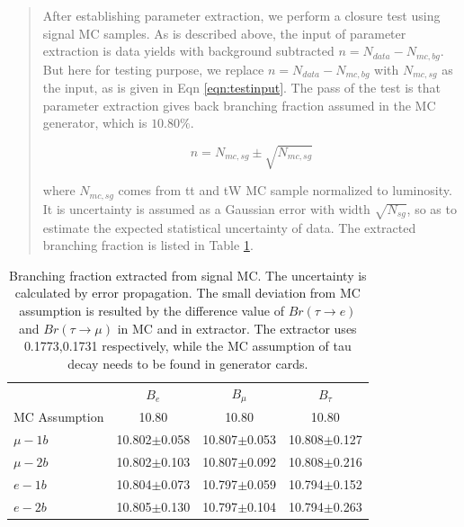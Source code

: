 \begin{quote}
    
    After establishing parameter extraction, we perform a closure test using 
    signal MC samples. As is described above, the input of parameter extraction 
    is data yields with background subtracted $n=N_{data} - N_{mc,bg}$. 
    But here for testing purpose, we replace $n=N_{data} - N_{mc,bg}$ with $N_{mc,sg}$ as the input,
    as is given in Eqn \ref{eqn:testinput}.
    The pass of the test is that parameter extraction 
    gives back branching fraction assumed in the MC generator, which is $10.80\%$.
    
    
    \begin{equation}
    	n=N_{mc,sg}\pm \sqrt{N_{mc,sg}}
    	\label{eqn:testinput}
    \end{equation}
    
    where $N_{mc,sg}$ comes from tt and tW MC sample normalized to luminosity. 
    It is uncertainty is assumed as a Gaussian error with width $\sqrt{N_{sg}}$, 
    so as to estimate the expected statistical uncertainty of data.
    The extracted branching fraction is listed in Table \ref{test_ana}.

\end{quote}



\begin{table}[ht]
    \centering
	\begin{tabular}{l|ccc}
    \hline
          	 & $B_e$             &   $B_\mu$       	 & 	  $B_\tau$   	 \\
    MC Assumption  & 10.80 		 &  10.80 		 	 & 	  10.80     	 \\
    \hline
  	$\mu-1b$ &   10.802$\pm$0.058  &   10.807$\pm$0.053  &    10.808$\pm$0.127 \\
  	$\mu-2b$ &   10.802$\pm$0.103  &   10.807$\pm$0.092  &    10.808$\pm$0.216 \\
  	$e-1b$   &   10.804$\pm$0.073  &   10.797$\pm$0.059  &    10.794$\pm$0.152 \\
  	$e-2b$   &   10.805$\pm$0.130  &   10.797$\pm$0.104  &    10.794$\pm$0.263 \\
    \hline
	\end{tabular}
	
    \caption{Branching fraction extracted from signal MC. The 
    uncertainty is calculated by error propagation. The small 
    deviation from MC assumption is resulted by the difference 
    value of $Br(\tau \to e)$ and $Br(\tau \to \mu)$ in MC and in 
    extractor. The extractor uses 0.1773,0.1731 respectively, while 
    the MC assumption of tau decay needs to be found in generator 
    cards. 
    }
    \label{test_ana}
\end{table}

